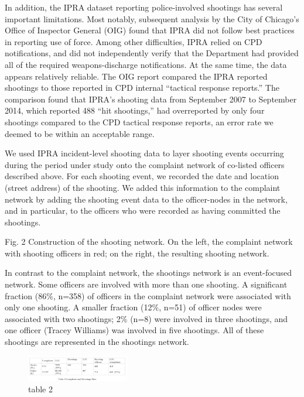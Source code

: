 In addition, the IPRA dataset reporting police-involved shootings has several
important limitations. Most notably, subsequent analysis by the City of
Chicago’s Office of Inspector General (OIG) found that IPRA did not follow best
practices in reporting use of force. Among other difficulties, IPRA relied on
CPD notifications, and did not independently verify that the Department had
provided all of the required weapons-discharge notifications.  At the same
time, the data appears relatively reliable. The OIG report compared the IPRA
reported shootings to those reported in CPD internal “tactical response
reports.” The comparison found that IPRA’s shooting data from September 2007 to
September 2014, which reported 488 “hit shootings,” had overreported by only
four shootings compared to the CPD tactical response reports, an error rate we
deemed to be within an acceptable range. 

We used IPRA incident-level shooting data to layer shooting events occurring
during the period under study onto the complaint network of co-listed officers
described above. For each shooting event, we recorded the date and location
(street address) of the shooting. We added this information to the complaint
network by adding the shooting event data to the officer-nodes in the network,
and in particular, to the officers who were recorded as having committed the
shootings. 

Fig. 2  Construction of the shooting network. On the left, the complaint network with shooting officers in red; on the right, the resulting shooting network.

In contrast to the complaint network, the shootings network is an event-focused
network. Some officers are involved with more than one shooting. A significant
fraction (86\%, n=358) of officers in the complaint network were associated
with only one shooting. A smaller fraction (12\%, n=51) of officer nodes were
associated with two shootings; 2\% (n=8) were involved in three shootings, and
one officer (Tracey Williams) was involved in five shootings. All of these
shootings are represented in the shootings network. 


\begin{figure}
\includegraphics[width=0.4\textwidth]{figs/complaints_shootings_table.png}
\caption{table 2}
\end{figure}



